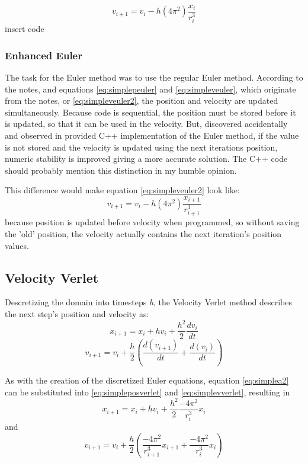 \documentclass[12pt]{article} %
\begin{document}
\begin{equation}	
	v_{i+1} = v_i - h(4\pi^2)\frac{x_i}{r_i^3}
	\label{eq:simpleveuler2}
\end{equation}
insert code

\subsubsection{Enhanced Euler}
The task for the Euler method was to use the regular Euler method. According to the notes, and equations \eqref{eq:simplepeuler} and \eqref{eq:simpleveuler}, which originate from the notes, or \eqref{eq:simpleveuler2}, the position and velocity are updated simultaneously.
Because code is sequential, the position must be stored before it is updated, so that it can be used in the velocity. But, discovered accidentally and observed in provided C++ implementation of the Euler method, if the value is not stored and the velocity is updated using the next iterations position, numeric stability is improved giving a more accurate solution. The C++ code should probably mention this distinction in my humble opinion.

This difference would make equation \eqref{eq:simpleveuler2} look like:
\begin{equation}	
	v_{i+1} = v_i - h(4\pi^2)\frac{x_{i+1}}{r_{i+1}^3}
\end{equation}
because position is updated before velocity when programmed, so without saving the 'old' position, the velocity actually contains the next iteration's position values.

\subsection{Velocity Verlet}
Descretizing the domain into timesteps \textit{h}, the Velocity Verlet method describes the next step's position and velocity as:
\begin{equation}
	x_{i+1} = x_i + hv_i + \frac{h^2}{2}\frac{dv_i}{dt}
	\label{eq:simpleposverlet}
\end{equation}
\begin{equation}
	v_{i+1} = v_i + \frac{h}{2}\left(\frac{d(v_{i+1})}{dt} + \frac{d(v_i)}{dt}\right)
	\label{eq:simplevverlet}
\end{equation}

As with the creation of the discretized Euler equations, equation \eqref{eq:simplea2} can be substituted into \eqref{eq:simpleposverlet} and \eqref{eq:simplevverlet}, resulting in
\begin{equation}
	x_{i+1} = x_i + hv_i + \frac{h^2}{2}\frac{-4\pi^2}{r_i^3}x_i
	\label{eq:simpleposverlet2}
\end{equation}
and
\begin{equation}
	v_{i+1} = v_i + \frac{h}{2}\left(\frac{-4\pi^2}{r_{i+1}^3}x_{i+1} + \frac{-4\pi^2}{r_i^3}x_i\right)
	\label{eq:simplevverlet2}
\end{equation}
\end{document}

